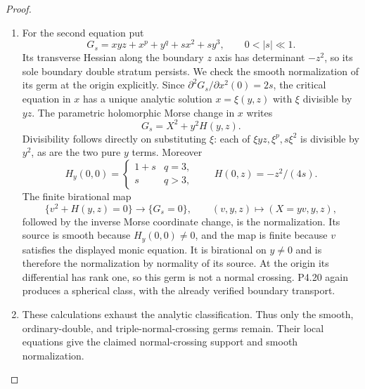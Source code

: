 \begin{proof}
\begin{enumerate}[label={$\langle1\rangle$\arabic*.},leftmargin=*]
\item For the second equation put
\[
 G_s=xyz+x^p+y^q+s x^2+s y^3,
 \qquad 0<|s|\ll1.
\]
Its transverse Hessian along the boundary
$z$ axis has determinant $-z^2$,
so its sole boundary double stratum
persists. We check the smooth normalization
of its germ at the origin explicitly.
Since $\partial^2G_s/\partial x^2(0)=2s$,
the critical equation in $x$ has a unique
analytic solution $x=\xi(y,z)$ with
$\xi$ divisible by $yz$. The parametric
holomorphic Morse change in $x$ writes
\[
 G_s=X^2+y^2H(y,z).
\]
Divisibility follows directly on substituting
$\xi$: each of $\xi yz,\xi^p,s\xi^2$
is divisible by $y^2$, as are the two
pure $y$ terms. Moreover
\[
 H_y(0,0)=
 \begin{cases}1+s&q=3,\\s&q>3,\end{cases}
 \qquad H(0,z)=-z^2/(4s).
\]
The finite
birational map
\[
 \{v^2+H(y,z)=0\}\longrightarrow\{G_s=0\},
 \qquad (v,y,z)\longmapsto(X=yv,y,z),
\]
followed by the inverse Morse coordinate
change, is the normalization. Its source
is smooth because $H_y(0,0)\ne0$,
and the map is finite because $v$
satisfies the displayed monic equation.
It is birational on $y\ne0$ and is
therefore the normalization by normality
of its source. At the origin its
differential has rank one, so this germ
is not a normal crossing. P4.20 again
produces a spherical class, with the
already verified boundary transport.

\item These calculations exhaust the analytic
classification. Thus only the smooth,
ordinary-double, and triple-normal-crossing
germs remain. Their local equations give
the claimed normal-crossing support and
smooth normalization.

\end{enumerate}
\end{proof}